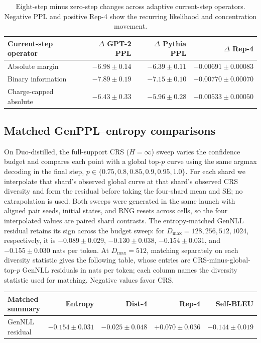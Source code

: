 \documentclass{article}
\newcommand{\1}{\mathbf 1}
\newcommand{\CRS}{\textsc{CRS}}
\theoremstyle{definition}
\begin{document}
\begin{table}[H]
\centering
\small
\setlength{\tabcolsep}{5pt}
\begin{tabular}{@{}lrrr@{}}
\toprule
Current-step operator & $\Delta$ GPT-2 PPL & $\Delta$ Pythia PPL & $\Delta$ Rep-4 \\
\midrule
Absolute margin & $-6.98\pm0.14$ & $-6.39\pm0.11$ & $+0.00691\pm0.00083$ \\
Binary information & $-7.89\pm0.19$ & $-7.15\pm0.10$ & $+0.00770\pm0.00070$ \\
Charge-capped absolute & $-6.43\pm0.33$ & $-5.96\pm0.28$ & $+0.00533\pm0.00050$ \\
\bottomrule
\end{tabular}
\caption{Eight-step minus zero-step changes across adaptive current-step
operators. Negative PPL and positive Rep-4 show the recurring likelihood and
concentration movement.}
\label{tab:operator-robustness-app}
\end{table}
\fi

\subsection{Matched GenPPL--entropy comparisons}

On Duo-distilled, the full-support \CRS{} ($H=\infty$) sweep varies the confidence budget and
compares each point with a global top-$p$ curve using the same argmax decoding in the final step,
$p\in\{0.75,0.8,0.85,0.9,0.95,1.0\}$. For each shard we interpolate that
shard's observed global curve at that shard's observed CRS diversity and form
the residual before taking the four-shard mean and SE; no extrapolation is
used. Both sweeps were generated in the same launch with aligned pair seeds,
initial states, and RNG resets across cells, so the four interpolated values
are paired shard contrasts. The entropy-matched GenNLL residual retains its
sign across the budget sweep: for
$D_{\max}=128,256,512,1024$, respectively, it is
$-0.089\pm0.029$, $-0.130\pm0.038$, $-0.154\pm0.031$, and
$-0.155\pm0.030$ nats per token.
At $D_{\max}=512$, matching separately on each diversity statistic gives the following table,
whose entries are CRS-minus-global-top-$p$ GenNLL residuals in nats per
token; each column names the diversity statistic used for matching. Negative
values favor CRS.
\begin{center}
\begin{tabular}{@{}lrrrr@{}}
\toprule
Matched summary & Entropy & Dist-4 & Rep-4 & Self-BLEU \\
\midrule
GenNLL residual & $-0.154\pm0.031$ & $-0.025\pm0.048$ & $+0.070\pm0.036$ & $-0.144\pm0.019$ \\
\bottomrule
\end{tabular}
\end{center}
\end{document}

